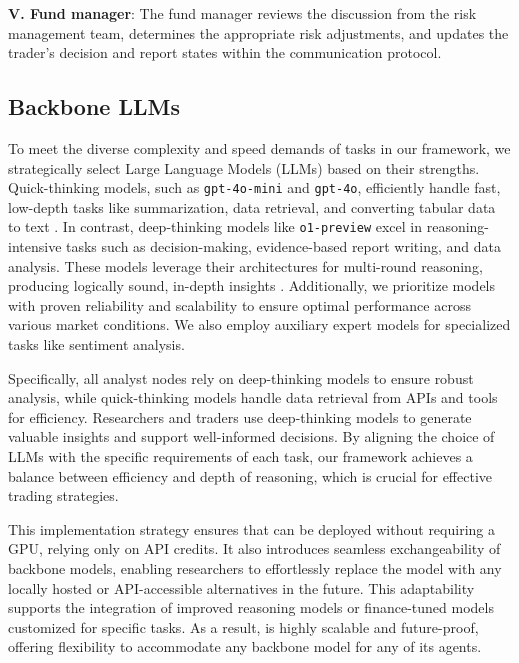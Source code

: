 \textbf{V. Fund manager}: The fund manager reviews the discussion from the risk management team, determines the appropriate risk adjustments, and updates the trader's decision and report states within the communication protocol.


\subsection{Backbone LLMs}

To meet the diverse complexity and speed demands of tasks in our framework, we strategically select Large Language Models (LLMs) based on their strengths. Quick-thinking models, such as \verb|gpt-4o-mini| and \verb|gpt-4o|, efficiently handle fast, low-depth tasks like summarization, data retrieval, and converting tabular data to text \citep{openai2024gpt4technicalreport}. In contrast, deep-thinking models like \verb|o1-preview| excel in reasoning-intensive tasks such as decision-making, evidence-based report writing, and data analysis. These models leverage their architectures for multi-round reasoning, producing logically sound, in-depth insights \citep{zhong2024evaluationopenaio1opportunities, wang2024planningabilitiesopenaiso1, openai2024o1}. Additionally, we prioritize models with proven reliability and scalability to ensure optimal performance across various market conditions. We also employ auxiliary expert models for specialized tasks like sentiment analysis.



Specifically, all analyst nodes rely on deep-thinking models to ensure robust analysis, while quick-thinking models handle data retrieval from APIs and tools for efficiency. Researchers and traders use deep-thinking models to generate valuable insights and support well-informed decisions. By aligning the choice of LLMs with the specific requirements of each task, our framework achieves a balance between efficiency and depth of reasoning, which is crucial for effective trading strategies.


This implementation strategy ensures that \model can be deployed without requiring a GPU, relying only on API credits. It also introduces seamless exchangeability of backbone models, enabling researchers to effortlessly replace the model with any locally hosted or API-accessible alternatives in the future. This adaptability supports the integration of improved reasoning models or finance-tuned models customized for specific tasks. As a result, \model is highly scalable and future-proof, offering flexibility to accommodate any backbone model for any of its agents.
